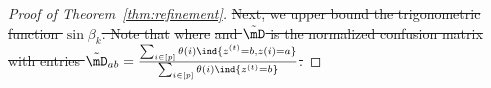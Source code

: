 \documentclass[lettersize,onecolumn,journal]{IEEEtran}
\theoremstyle{definition}
\theoremstyle{definition}
\providecommand{\DIFdeltex}[1]{{\protect\color{red}\sout{#1}}}                      %
\providecommand{\DIFdel}[1]{\texorpdfstring{\DIFdeltex{#1}}{}} %
\begin{document}
\begin{proof}[Proof of Theorem~\ref{thm:refinement}]
\DIFdel{Next, we upper bound the trigonometric function $\sin \beta_k$. Note that
    }%
\DIFdel{where
    }%
\DIFdel{and $\tilde \mD$ is the normalized confusion matrix with entries $\tilde \mD_{ab} = \frac{\sum_{i \in [p]} \theta(i) \ind\{z^{(t)} = b, z(i) = a\}}{\sum_{i \in [p] }\theta(i) \ind\{z^{(t)} = b\}}$.
    }%


\end{proof}
\end{document}
